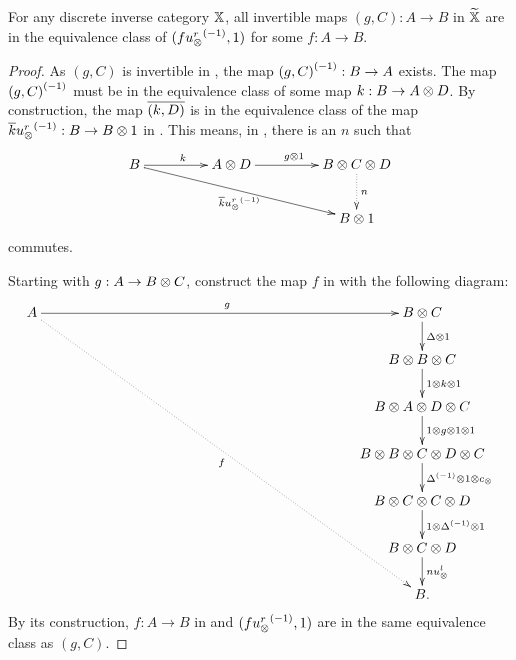 \begin{lemma}\label{lem:all_invertible_maps_in_xt_are_of_the_form_f_inv_usr}
  For any discrete inverse category $\mathbb{X}$, all invertible maps $(g,C):A\to B$ in $\widetilde{\mathbb{X}}$ are in the
  equivalence class of $(f {u_{\otimes}^r}^{(-1)},1)$ for some $f:A\to B$.
\end{lemma}
\begin{proof}
  As $(g,C)$ is invertible in \Xt, the map ${(g,C)}^{(-1)}: B \to A$ exists. The map ${(g,C)}^{(-1)}$ must be in
  the equivalence class of some map $k:B \to A \otimes D$. By construction, the map  $\overline{(k,D)}$ is
  in the equivalence class of the map $\overline{k}{u_{\otimes}^r}^{(-1)}:B \to B\otimes1$ in \X. This means,
  in \X, there is an $n$ such that
  \[
    \xymatrix @C=45pt @R=25pt{
      B \ar[r]^{k} \ar[rrd]_{\rst{k}\inv{\usr}}
        & A \*D \ar[r]^{g\*1}&B\*C\*D  \ar@{.>}[d]^{n} \\
      && B\* 1
    }
  \]
  commutes.

  Starting with $g:A\to B\otimes C$, construct the map $f$ in \X with the following diagram:
  \[
    \xymatrix @C=225pt @R=20pt{
      A \ar[r]^{g} \ar@{.>}[rdddddd]_{f}& B \*C \ar[d]^{\Delta\*1}\\
      &B\*B\*C \ar[d]^{1\*k\*1}\\
      &B\*A\*D\*C \ar[d]^{1\*g\*1\*1}\\
      &B\*B\*C\*D\*C \ar[d]^{\inv{\Delta}\*1\*c_{\*}}\\
      &B\*C\*C\*D \ar[d]^{1\*\inv{\Delta}\*1}\\
      &B\*C\*D \ar[d]^{n \usl}\\
      &B.
    }
  \]
  By its construction, $f:A\to B$ in \X and $(f{u_{\otimes}^r}^{(-1)},1)$ are in the same equivalence class as
  $(g,C)$.

\end{proof}

